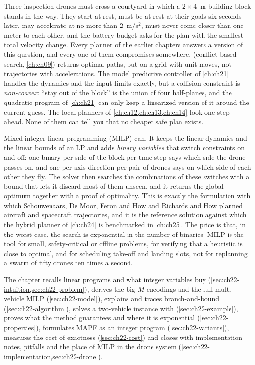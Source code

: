 Three inspection drones must cross a courtyard in which a $2\times4$~m
building block stands in the way. They start at rest, must be at rest at
their goals six seconds later, may accelerate at no more than $2$~m/s$^2$,
must never come closer than one meter to each other, and the battery budget
asks for the plan with the smallest total velocity change. Every planner of
the earlier chapters answers a version of this question, and every one of
them compromises somewhere. \cbs (conflict-based search, \cref{ch:ch09}) returns optimal paths, but
on a grid with unit moves, not trajectories with accelerations. The model
predictive controller of \cref{ch:ch21} handles the dynamics and the input
limits exactly, but a collision constraint is \emph{non-convex}: ``stay out
of the block'' is the union of four half-planes, and the quadratic program
of \cref{ch:ch21} can only keep a linearized version of it around the current
guess. The local planners of \cref{ch:ch12,ch:ch13,ch:ch14} look one step
ahead. None of them can tell you that no cheaper safe plan exists.

Mixed-integer linear programming (MILP) can. It keeps the linear
dynamics and the linear bounds of an LP and adds \emph{binary variables}
that switch constraints on and off: one binary per side of the block per time
step says which side the drone passes on, and one per axis direction per pair
of drones says on which side of each other they fly. The solver then searches
the combinations of these switches with a bound that lets it discard most
of them unseen, and it returns the global optimum together with a proof of
optimality. This is exactly the formulation with which Schouwenaars, De Moor,
Feron and How \cite{schouwenaars2001mixed} and Richards and How
\cite{richards2002aircraft} planned aircraft and spacecraft trajectories, and
it is the reference solution against which the hybrid planner of
\cref{ch:ch24} is benchmarked in \cref{ch:ch25}. The price is that, in the
worst case, the search is exponential in the number of binaries: MILP is the
tool for small, safety-critical or offline problems, for verifying that a
heuristic is close to optimal, and for scheduling take-off and landing slots,
not for replanning a swarm of fifty drones ten times a second.

The chapter recalls linear programs and what integer variables buy
(\cref{sec:ch22-intuition,sec:ch22-problem}), derives the big-$M$ encodings
and the full multi-vehicle MILP (\cref{sec:ch22-model}), explains and traces
branch-and-bound (\cref{sec:ch22-algorithm}), solves a two-vehicle instance
with  (\cref{sec:ch22-example}), proves what the
method guarantees and where it is exponential (\cref{sec:ch22-properties}),
formulates MAPF as an integer program (\cref{sec:ch22-variants}), measures
the cost of exactness (\cref{sec:ch22-cost}) and closes with implementation
notes, pitfalls and the place of MILP in the drone system
(\cref{sec:ch22-implementation,sec:ch22-drone}).

